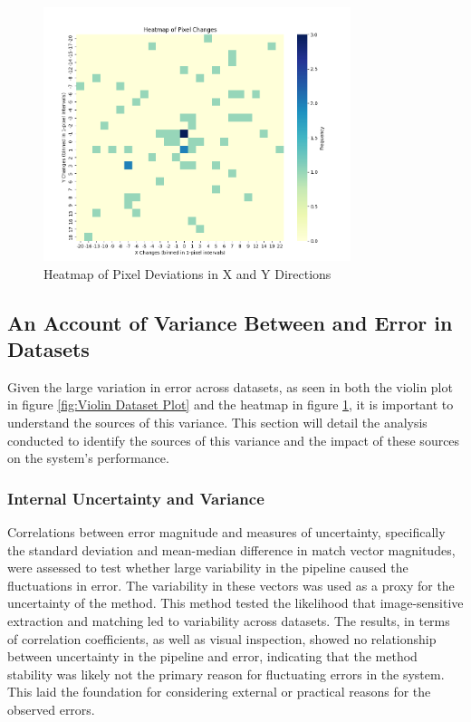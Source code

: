 \begin{figure}[H]
    \centering
    \includegraphics[width=0.8\textwidth]{Chapter 5/RESULTPLOTS/BIASPLOT_XY_HEAT.png}
    \caption{Heatmap of Pixel Deviations in X and Y Directions}
    \label{fig:Heatmap_XY_Dev}
\end{figure}


\subsection{An Account of Variance Between and Error in Datasets}
Given the large variation in error across datasets, as seen in both the violin plot in figure \ref{fig:Violin Dataset Plot} and the heatmap in figure \ref{fig:Heatmap_XY_Dev}, it is important to understand the sources of this variance. This section will detail the analysis conducted to identify the sources of this variance and the impact of these sources on the system's performance.

\subsubsection{Internal Uncertainty and Variance}
Correlations between error magnitude and measures of uncertainty, specifically the standard deviation and mean-median difference in match vector magnitudes, were assessed to test whether large variability in the pipeline caused the fluctuations in error. The variability in these vectors was used as a proxy for the uncertainty of the method. This method tested the likelihood that image-sensitive extraction and matching led to variability across datasets. The results, in terms of correlation coefficients, as well as visual inspection, showed no relationship between uncertainty in the pipeline and error, indicating that the method stability was likely not the primary reason for fluctuating errors in the system. This laid the foundation for considering external or practical reasons for the observed errors.

